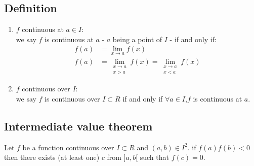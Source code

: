 \documentclass[notitlepage]{math}
\begin{document}
\subsection{Definition}
\begin{enumerate}[label=\protect\circled{\arabic*}]
    \item $f$ continuous at $a \in I$: \\ we say $f$ is continuous at $a$ - $a$ being a point of $I$ - if and only if:
    \begin{align*}
        f(a) &= \lim_{x \to a} f(x) \\
        f(a) &= \lim_{\begin{smallmatrix}
            x \to a \\
            x > a
        \end{smallmatrix}}f(x) = \lim_{\begin{smallmatrix}
            x \to a \\
            x < a
        \end{smallmatrix}}f(x) 
    \end{align*}
    \item $f$ continuous over $I$: \\ we say $f$ is continuous over $I \subset R$ if and only if $\forall a \in I$,$f$ is continuous at $a$.
\end{enumerate}
\subsection{Intermediate value theorem}
Let $f$ be a function continuous over $I \subset R$ and $(a,b) \in I^2$. if $f(a) f(b) < 0$ then there exists (at least one) $c$ from $]a,b[$ such that $f(c) = 0$.
\end{document}
